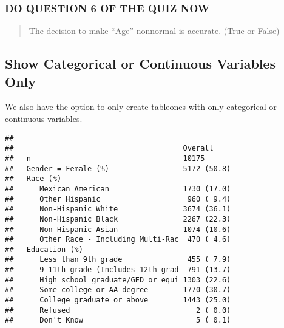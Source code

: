 \documentclass[
]{book}
\newenvironment{Shaded}{\begin{snugshade}}{\end{snugshade}}
\newcommand{\DocumentationTok}[1]{\textcolor[rgb]{0.56,0.35,0.01}{\textbf{\textit{#1}}}}
\newcommand{\NormalTok}[1]{#1}
\newcommand{\SpecialCharTok}[1]{\textcolor[rgb]{0.00,0.00,0.00}{#1}}
\begin{document}
\hypertarget{do-question-6-of-the-quiz-now-3}{%
\subsubsection{DO QUESTION 6 OF THE QUIZ NOW}\label{do-question-6-of-the-quiz-now-3}}

\begin{quote}
The decision to make ``Age'' nonnormal is accurate. (True or False)
\end{quote}

\hypertarget{show-categorical-or-continuous-variables-only}{%
\subsection{Show Categorical or Continuous Variables Only}\label{show-categorical-or-continuous-variables-only}}

We also have the option to only create tableones with only categorical or continuous variables.

\begin{Shaded}
\end{Shaded}

\begin{verbatim}
##                                      
##                                       Overall     
##   n                                   10175       
##   Gender = Female (%)                 5172 (50.8) 
##   Race (%)                                        
##      Mexican American                 1730 (17.0) 
##      Other Hispanic                    960 ( 9.4) 
##      Non-Hispanic White               3674 (36.1) 
##      Non-Hispanic Black               2267 (22.3) 
##      Non-Hispanic Asian               1074 (10.6) 
##      Other Race - Including Multi-Rac  470 ( 4.6) 
##   Education (%)                                   
##      Less than 9th grade               455 ( 7.9) 
##      9-11th grade (Includes 12th grad  791 (13.7) 
##      High school graduate/GED or equi 1303 (22.6) 
##      Some college or AA degree        1770 (30.7) 
##      College graduate or above        1443 (25.0) 
##      Refused                             2 ( 0.0) 
##      Don't Know                          5 ( 0.1)
\end{verbatim}
\end{document}
